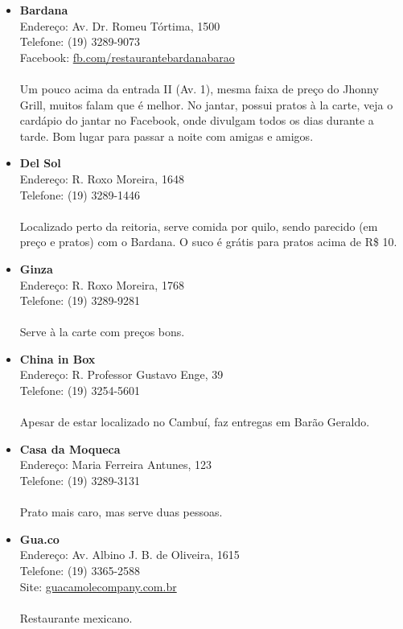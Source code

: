 \begin{itemize}
\item \textbf{Bardana}
  \\Endereço: Av. Dr. Romeu Tórtima, 1500
  \\Telefone: (19) 3289-9073
  \\Facebook: \url{fb.com/restaurantebardanabarao}
  \\
  \\Um pouco acima da entrada II (Av. 1), mesma faixa de preço do Jhonny Grill,
  muitos falam que é melhor. No jantar, possui pratos à la carte, veja o
  cardápio do jantar no Facebook, onde divulgam todos os dias durante a tarde.
  Bom lugar para passar a noite com amigas e amigos.

\item \textbf{Del Sol}
  \\Endereço: R. Roxo Moreira, 1648
  \\Telefone: (19) 3289-1446
  \\
  \\Localizado perto da reitoria, serve comida por quilo, sendo parecido (em
  preço e pratos) com o Bardana. O suco é grátis para pratos acima de R\$ 10.

\item \textbf{Ginza}
  \\Endereço: R. Roxo Moreira, 1768
  \\Telefone: (19) 3289-9281
  \\
  \\Serve à la carte com preços bons.

\item \textbf{China in Box}
  \\Endereço: R. Professor Gustavo Enge, 39
  \\Telefone: (19) 3254-5601
  \\
  \\Apesar de estar localizado no Cambuí, faz entregas em Barão Geraldo.

\item \textbf{Casa da Moqueca}
  \\Endereço: Maria Ferreira Antunes, 123
  \\Telefone: (19) 3289-3131
  \\
  \\Prato mais caro, mas serve duas pessoas.

\item \textbf{Gua.co}
  \\Endereço: Av. Albino J. B. de Oliveira, 1615
  \\Telefone: (19) 3365-2588
  \\Site: \url{guacamolecompany.com.br}
  \\
  \\Restaurante mexicano.


\end{itemize}

